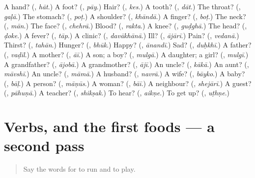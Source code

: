 \begin{tcolorbox}[breakable,colback=teal!4,colframe=teal!35!black,title={Before you move on}]
A hand? (\textbf{}, \emph{hāt}.) A foot? (\textbf{}, \emph{pāy}.) Hair? (\textbf{}, \emph{kes}.) A tooth? (\textbf{}, \emph{dāt}.) The throat? (\textbf{}, \emph{gaḷā}.) The stomach? (\textbf{}, \emph{poṭ}.) A shoulder? (\textbf{}, \emph{khāndā}.) A finger? (\textbf{}, \emph{boṭ}.) The neck? (\textbf{}, \emph{mān}.) The face? (\textbf{}, \emph{chehrā}.) Blood? (\textbf{}, \emph{rakta}.) A knee? (\textbf{}, \emph{guḍghā}.) The head? (\textbf{}, \emph{ḍoke}.) A fever? (\textbf{}, \emph{tāp}.) A clinic? (\textbf{}, \emph{davākhānā}.) Ill? (\textbf{}, \emph{ājārī}.) Pain? (\textbf{}, \emph{vedanā}.) Thirst? (\textbf{}, \emph{tahān}.) Hunger? (\textbf{}, \emph{bhūk}.) Happy? (\textbf{}, \emph{ānandī}.) Sad? (\textbf{}, \emph{duḥkhī}.) A father? (\textbf{}, \emph{vaḍīl}.) A mother? (\textbf{}, \emph{āī}.) A son; a boy? (\textbf{}, \emph{mulgā}.) A daughter; a girl? (\textbf{}, \emph{mulgī}.) A grandfather? (\textbf{}, \emph{ājobā}.) A grandmother? (\textbf{}, \emph{ājī}.) An uncle? (\textbf{}, \emph{kākā}.) An aunt? (\textbf{}, \emph{māvshī}.) An uncle? (\textbf{}, \emph{māmā}.) A husband? (\textbf{}, \emph{navrā}.) A wife? (\textbf{}, \emph{bāyko}.) A baby? (\textbf{}, \emph{bāḷ}.) A person? (\textbf{}, \emph{māṇūs}.) A woman? (\textbf{}, \emph{bāī}.) A neighbour? (\textbf{}, \emph{shejārī}.) A guest? (\textbf{}, \emph{pāhuṇā}.) A teacher? (\textbf{}, \emph{shikṣak}.) To hear? (\textbf{}, \emph{aikṇe}.) To get up? (\textbf{}, \emph{uṭhṇe}.)
\end{tcolorbox}
\section[(dialogue)]{Verbs, and the first foods — a second pass}

\label{lesson:MR-R86-second-pass-verbs-and-the-first-foods}



\begin{quote}
Say the words for to run and to play.
\end{quote}

